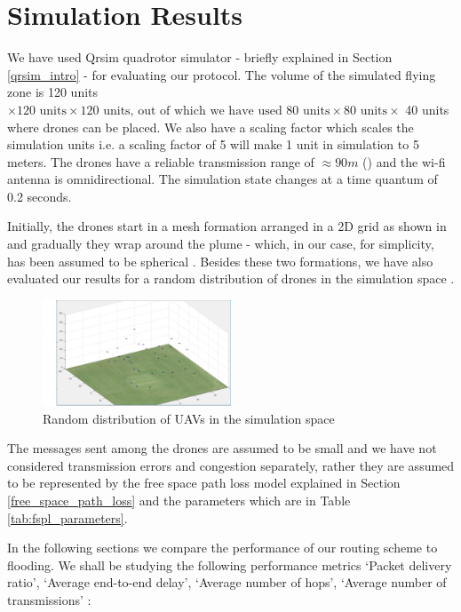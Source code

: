 \chapter{Simulation Results}
\newcommand\simResultFigSize{0.7}
\label{chap-five}

We have used Qrsim quadrotor simulator \cite{denardi2013rn} - briefly explained in Section \ref{qrsim_intro} - for evaluating our protocol. The volume of the simulated flying zone is 120 units $ \times \text{120 units} \times \text{120 units, out of which we have used 80 units} \times \text{80 units}\times $ 40 units where drones can be placed. We also have a scaling factor which scales the simulation units i.e. a scaling factor of 5 will make 1 unit in simulation to 5 meters. The drones have a reliable transmission range of $\approx 90 m$ () and the wi-fi antenna is omnidirectional. The simulation state changes at a time quantum of 0.2 seconds.

Initially, the drones start in a mesh formation arranged in a 2D grid as shown in  and gradually they wrap around the plume - which, in our case, for simplicity, has been assumed to be spherical . Besides these two formations, we have also evaluated our results for a random distribution of drones in the simulation space .

\begin{figure}[hbtp]
\centering
\includegraphics[width=0.5\textwidth]{ncsuthesis-0.6/Chapter-5/figs/random_drone_locations}
\caption{Random distribution of UAVs in the simulation space}
\label{fig:random_formation}
\end{figure}

The messages sent among the drones are assumed to be small and we have not considered transmission errors and congestion separately, rather they are assumed to be represented by the free space path loss model explained in Section \ref{free_space_path_loss} and the parameters which are in Table \ref{tab:fspl_parameters}. 

In the following sections we compare the performance of our routing scheme to flooding. We shall be studying the following performance metrics `Packet delivery ratio', `Average end-to-end delay', `Average number of hops', `Average number of transmissions' \cite{OUBBATI201729}:

